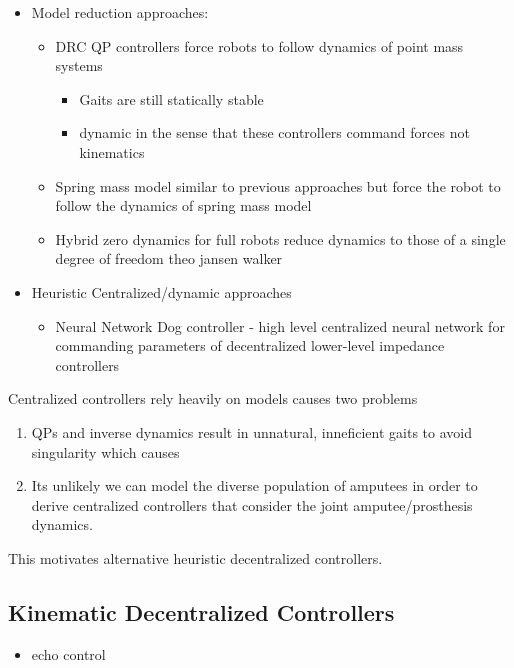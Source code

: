    \begin{itemize}
        \item Model reduction approaches:        
            \begin{itemize}
                \item DRC  QP controllers force robots to follow dynamics of
                    point mass systems
                \begin{itemize}
                    \item Gaits are still statically stable
                    \item dynamic in the sense that these controllers command forces
                        not kinematics
                \end{itemize}


                \item Spring mass model similar to previous approaches but force
                the robot to follow the dynamics of spring mass model

                \item Hybrid zero dynamics for full robots reduce dynamics to
                those of a single degree of freedom theo jansen walker
            \end{itemize}

        \item Heuristic Centralized/dynamic approaches
        \begin{itemize}
            \item Neural Network Dog controller - high level centralized neural
            network for commanding parameters of decentralized lower-level
            impedance controllers
        \end{itemize}
    \end{itemize}

Centralized controllers rely heavily on models causes two problems
\begin{enumerate}
    \item QPs and inverse dynamics result in unnatural, inneficient gaits to avoid
    singularity which causes
    \item Its unlikely we can model the diverse population of amputees in order
    to derive centralized controllers that consider the joint amputee/prosthesis
    dynamics.
\end{enumerate}
This motivates alternative heuristic decentralized controllers.


\subsection{Kinematic Decentralized Controllers}
    \begin{itemize}
        \item echo control
    \end{itemize}
